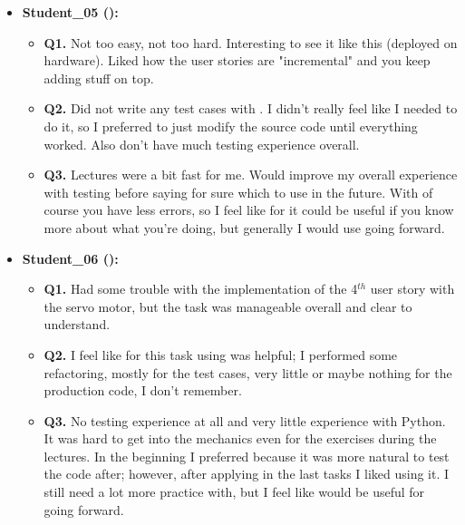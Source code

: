 \begin{itemize}
    \item \textbf{Student\_05 (\tdd):}
    \begin{itemize}
        \item \textbf{Q1.} Not too easy, not too hard. Interesting to see it like this (deployed on hardware). Liked how the user stories are "incremental" and you keep adding stuff on top.
        \item \textbf{Q2.} Did not write any test cases with \notdd. I didn't really feel like I needed to do it, so I preferred to just modify the source code until everything worked. Also don't have much testing experience overall.
        \item \textbf{Q3.} Lectures were a bit fast for me. Would improve my overall experience with testing before saying for sure which to use in the future.  With \tdd of course you have less errors, so I feel like for \ess it could be useful if you know more about what you're doing, but generally I would use \notdd going forward.
    \end{itemize}

    \item \textbf{Student\_06 (\tdd):}
    \begin{itemize}
        \item \textbf{Q1.} Had some trouble with the implementation of the 4$^{th}$ user story with the servo motor, but the task was manageable overall and clear to understand.
        \item \textbf{Q2.} I feel like for this task using \tdd was helpful; I performed some refactoring, mostly for the test cases, very little or maybe nothing for the production code, I don't remember.
        \item \textbf{Q3.} No testing experience at all and very little experience with Python. It was hard to get into the mechanics even for the exercises during the lectures. In the beginning I preferred \notdd because it was more natural to test the code after; however, after applying \tdd in the last tasks I liked using it. I still need a lot more practice with, but I feel like \tdd would be useful for \ess going forward.
    \end{itemize}


\end{itemize}
